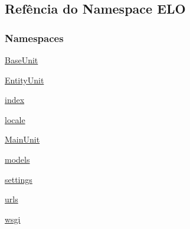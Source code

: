 \hypertarget{namespaceELO}{}\subsection{Refência do Namespace E\+L\+O}
\label{namespaceELO}
\subsubsection*{Namespaces}
\begin{DoxyCompactItemize}
\item 
 \hyperlink{namespaceELO_1_1BaseUnit}{Base\+Unit}
\item 
 \hyperlink{namespaceELO_1_1EntityUnit}{Entity\+Unit}
\item 
 \hyperlink{namespaceELO_1_1index}{index}
\item 
 \hyperlink{namespaceELO_1_1locale}{locale}
\item 
 \hyperlink{namespaceELO_1_1MainUnit}{Main\+Unit}
\item 
 \hyperlink{namespaceELO_1_1models}{models}
\item 
 \hyperlink{namespaceELO_1_1settings}{settings}
\item 
 \hyperlink{namespaceELO_1_1urls}{urls}
\item 
 \hyperlink{namespaceELO_1_1wsgi}{wsgi}
\end{DoxyCompactItemize}
